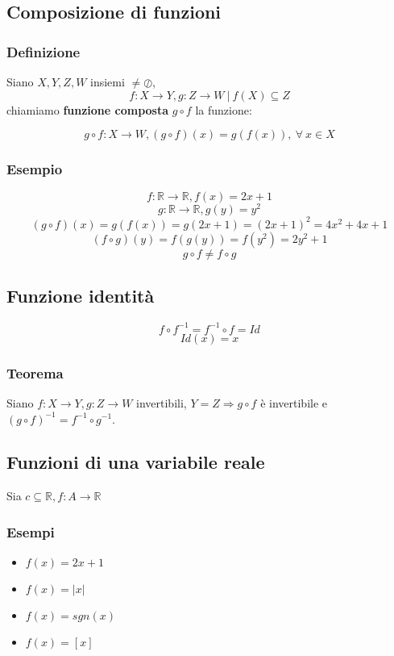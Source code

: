 \subsection{Composizione di funzioni}
\subsubsection*{Definizione}
    Siano $X,Y,Z,W$ insiemi $\neq \oslash$,
    \[f:X \rightarrow Y, g:Z\rightarrow W\ |\ f(X) \subseteq Z\]
    chiamiamo \textbf{funzione composta} $g \circ f$ la funzione:
    \begin{Large}
    \[
        g \circ f: X \rightarrow W, (g \circ f)(x) = g(f(x)),\ \forall\ x \in X 
    \]
    \end{Large}
\subsubsection*{Esempio}
\begin{Large}
    \[
        f : \mathbb{R} \rightarrow \mathbb{R}, f(x) = 2x + 1
    \]
    \[
        g : \mathbb{R} \rightarrow \mathbb{R}, g(y) = y^{2}
    \]
    \[
        (g \circ f)(x) = g(f(x)) = g(2x + 1) = (2x + 1)^{2} = 4x^{2} + 4x +1    
    \]
    \[
        (f \circ g)(y) = f(g(y)) = f(y^{2}) = 2y^{2} + 1
    \]
    \[
        g \circ f \neq f \circ g    
    \]
\end{Large}
\subsection{Funzione identità}
\begin{Large}
\[
    f \circ f^{-1} = f^{-1} \circ f = Id    
\]
\[
    Id(x) = x    
\]
\end{Large}
\subsubsection*{Teorema}
Siano $f: X \rightarrow Y, g: Z \rightarrow W$ invertibili, $Y = Z \Rightarrow g \circ f$ è invertibile 
e $(g \circ f)^{-1} = f^{-1} \circ g^{-1}$.

\subsection{Funzioni di una variabile reale}
Sia $c \subseteq \mathbb{R}, f:A \rightarrow \mathbb{R}$
\subsubsection*{Esempi}
\begin{itemize}
\item $f(x) = 2x + 1$
\item $f(x) = |x|$
\item $f(x) = sgn(x)$
\item $f(x) = [x]$
\end{itemize}

